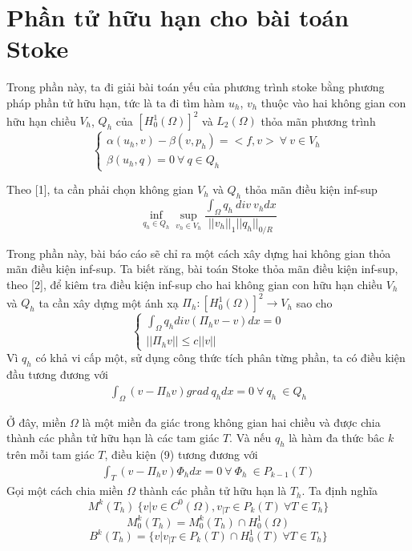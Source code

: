 \documentclass[14pt]{extreport}
\begin{document}
{\section{Phần tử hữu hạn cho bài toán Stoke}
Trong phần này, ta đi giải bài toán yếu của phương trình stoke bằng phương pháp phần tử hữu hạn, tức là ta đi tìm hàm $u_h$, $v_h$ thuộc vào hai không gian con hữu hạn chiều $V_h$, $Q_h$ của $[ H_0^1(\Omega) ]^2$ và $L_2(\Omega)$ thỏa mãn phương trình
$$
\begin{cases}
\alpha(u_h,v) - \beta(v, p_h) = <f, v> \ \forall \ v \in V_h \\
\beta(u_h, q) = 0 \ \forall \ q \in Q_h
\end{cases}
$$

Theo [1], ta cần phải chọn không gian $V_h$ và $Q_h$ thỏa mãn điều kiện inf-sup
$$\inf_{q_h \in Q_h} \sup_{v_h \in V_h} \frac{\int_{\Omega} q_h \ div \ v_h dx}{||v_h||_{1} ||q_h||_{0/R}}$$

Trong phần này, bài báo cáo sẽ chỉ ra một cách xây dựng hai không gian thỏa mãn điều kiện inf-sup. Ta biết răng, bài toán Stoke thỏa mãn điều kiện inf-sup, theo [2], để kiêm tra điều kiện inf-sup cho hai không gian con hữu hạn chiều $V_h$ và $Q_h$ ta cần xây dựng một ánh xạ $\Pi_h : [H_0^1 (\Omega)]^2 \rightarrow V_h$ sao cho
$$
\begin{cases}
\int_{\Omega} q_h div(\Pi_hv - v) dx = 0 \\
||\Pi_hv|| \leq c ||v||
\end{cases}
$$
Vì $q_h$ có khả vi cấp một, sử dụng công thức tích phân từng phần, ta có điều kiện đầu tương đương với
\begin{equation} \label{eq9}
\begin{split}
\int_{\Omega} (v - \Pi_hv) grad \ q_h dx = 0 \ \forall \ q_h \ \in Q_h
\end{split}
\end{equation}

Ở đây, miền $\Omega$ là một miền đa giác trong không gian hai chiều và được chia thành các phần tử hữu hạn là các tam giác $T$. Và nếu $q_h$ là hàm đa thức bâc $k$ trên mỗi tam giác $T$, điều kiện (9) tương đương với
\begin{equation} \label{eq10}
\begin{split}
\int_{T} (v - \Pi_hv) \Phi_h dx = 0 \ \forall \ \Phi_h \ \in P_{k-1}(T)
\end{split}
\end{equation}
Gọi một cách chia miền $\Omega$ thành các phần tử hữu hạn là $T_h$. Ta định nghĩa
$$M^k(T_h) \ \{ v| v\in C^0(\Omega), v_{|T} \in P_k(T) \ \forall T \in T_h \}$$
$$M_0^k(T_h) = M_0^k(T_h) \cap H_0^1(\Omega)$$
$$B^k(T_h) = \{ v | v_{|T} \in P_k(T) \cap H_0^1(T) \ \forall T \in T_h \}$$

}
\end{document}
